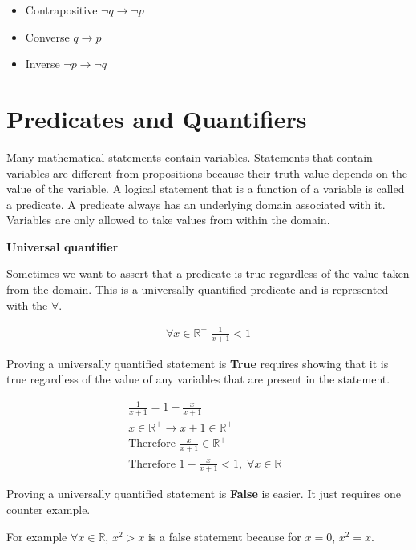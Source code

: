 \documentclass[12pt]{article}
\begin{document}
\begin{itemize}
\item Contrapositive $\neg q \rightarrow \neg p$
\item Converse $q \rightarrow p$
\item Inverse $\neg p \rightarrow \neg q$
\end{itemize}

\section*{Predicates and Quantifiers}
Many mathematical statements contain variables. Statements that contain variables are different from propositions because their truth value depends on the value of the variable. A logical statement that is a function of a variable is called a predicate. A predicate always has an underlying domain associated with it. Variables are only allowed to take values from within the domain.

\medskip

\textbf{Universal quantifier}

Sometimes we want to assert that a predicate is true regardless of the value taken from the domain. This is a universally quantified predicate and is represented with the $\forall$.

\begin{align*}
\forall x \in \mathbb{R^+} \; \frac{1}{x+1} < 1
\end{align*}

Proving a universally quantified statement is \textbf{True} requires showing that it is true regardless of the value of any variables that are present in the statement.

\begin{align*}
\frac{1}{x+1} = 1 - \frac{x}{x+1} \\
x \in \mathbb{R^+} \rightarrow x + 1 \in \mathbb{R^+} \\
\text{Therefore } \frac{x}{x+1} \in \mathbb{R^+}\\
\text{Therefore } 1 - \frac{x}{x+1} < 1, \; \forall x \in \mathbb{R^+} 
\end{align*}

Proving a universally quantified statement is \textbf{False} is easier. It just requires one counter example.

For example $\forall x \in \mathbb{R}, \, x^2 > x$ is a false statement because for $x = 0$, $x^2 = x$.

\medskip
\end{document}
